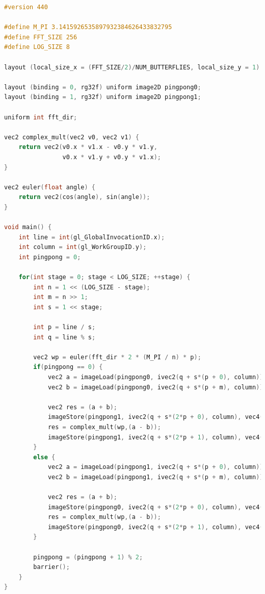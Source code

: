 \documentclass[
  oneside,
  11pt, a4paper,
  footinclude=true,
  headinclude=true,
  cleardoublepage=empty
]{scrbook}
\begin{document}
\begin{lstlisting}[language=C, caption={FFT Radix-2 Stockham Horizontal unique pass, see \autoref{sec:radix2-stockham}}, label={lst:glsl-radix2-stockham-horizontal}]
#version 440

#define M_PI 3.1415926535897932384626433832795
#define FFT_SIZE 256
#define LOG_SIZE 8

layout (local_size_x = (FFT_SIZE/2)/NUM_BUTTERFLIES, local_size_y = 1) in;

layout (binding = 0, rg32f) uniform image2D pingpong0;
layout (binding = 1, rg32f) uniform image2D pingpong1;

uniform int fft_dir;

vec2 complex_mult(vec2 v0, vec2 v1) {
    return vec2(v0.x * v1.x - v0.y * v1.y,
                v0.x * v1.y + v0.y * v1.x);
}

vec2 euler(float angle) {
    return vec2(cos(angle), sin(angle));
}

void main() {
    int line = int(gl_GlobalInvocationID.x);
    int column = int(gl_WorkGroupID.y);
    int pingpong = 0;

    for(int stage = 0; stage < LOG_SIZE; ++stage) {
        int n = 1 << (LOG_SIZE - stage);
        int m = n >> 1;
        int s = 1 << stage;

        int p = line / s;
        int q = line % s;
            
        vec2 wp = euler(fft_dir * 2 * (M_PI / n) * p);
        if(pingpong == 0) {
            vec2 a = imageLoad(pingpong0, ivec2(q + s*(p + 0), column)).rg;
            vec2 b = imageLoad(pingpong0, ivec2(q + s*(p + m), column)).rg;

            vec2 res = (a + b);
            imageStore(pingpong1, ivec2(q + s*(2*p + 0), column), vec4(res,0,0));
            res = complex_mult(wp,(a - b));
            imageStore(pingpong1, ivec2(q + s*(2*p + 1), column), vec4(res,0,0));
        }
        else {
            vec2 a = imageLoad(pingpong1, ivec2(q + s*(p + 0), column)).rg;
            vec2 b = imageLoad(pingpong1, ivec2(q + s*(p + m), column)).rg;

            vec2 res = (a + b);
            imageStore(pingpong0, ivec2(q + s*(2*p + 0), column), vec4(res,0,0));
            res = complex_mult(wp,(a - b));
            imageStore(pingpong0, ivec2(q + s*(2*p + 1), column), vec4(res,0,0));
        }
        
        pingpong = (pingpong + 1) % 2;
        barrier();
    }
}
\end{lstlisting}
\end{document}
